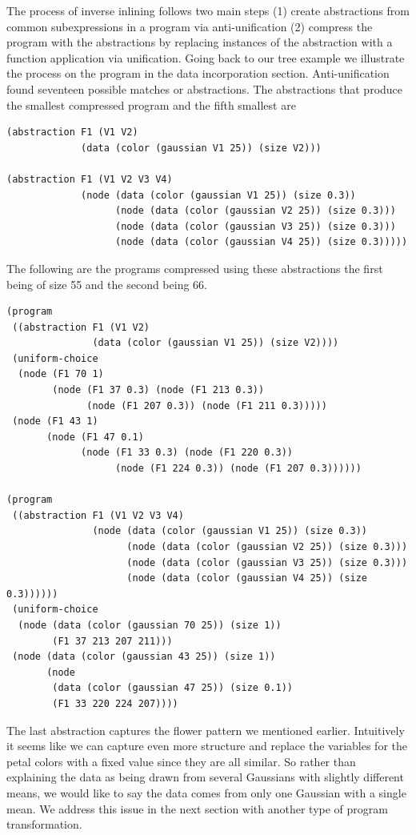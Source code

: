 \documentclass[a4paper,10pt]{article}
\begin{document}
The process of inverse inlining follows two main steps (1) create abstractions from common subexpressions in a program via anti-unification (2) compress the program with the abstractions by replacing instances of the abstraction with a function application via unification.  Going back to our tree example we illustrate the process on the program in the data incorporation section.
Anti-unification found seventeen possible matches or abstractions.  The abstractions that produce the smallest compressed program and the fifth smallest are 
\begin{lstlisting}
(abstraction F1 (V1 V2)
             (data (color (gaussian V1 25)) (size V2)))

(abstraction F1 (V1 V2 V3 V4)
             (node (data (color (gaussian V1 25)) (size 0.3))
                   (node (data (color (gaussian V2 25)) (size 0.3)))
                   (node (data (color (gaussian V3 25)) (size 0.3)))
                   (node (data (color (gaussian V4 25)) (size 0.3)))))
\end{lstlisting}
The following are the programs compressed using these abstractions the first being of size 55 and the second being 66.
\begin{lstlisting}
(program
 ((abstraction F1 (V1 V2)
               (data (color (gaussian V1 25)) (size V2))))
 (uniform-choice
  (node (F1 70 1)
        (node (F1 37 0.3) (node (F1 213 0.3))
              (node (F1 207 0.3)) (node (F1 211 0.3)))))
 (node (F1 43 1)
       (node (F1 47 0.1)
             (node (F1 33 0.3) (node (F1 220 0.3))
                   (node (F1 224 0.3)) (node (F1 207 0.3))))))

(program
 ((abstraction F1 (V1 V2 V3 V4)
               (node (data (color (gaussian V1 25)) (size 0.3))
                     (node (data (color (gaussian V2 25)) (size 0.3)))
                     (node (data (color (gaussian V3 25)) (size 0.3)))
                     (node (data (color (gaussian V4 25)) (size 0.3))))))
 (uniform-choice
  (node (data (color (gaussian 70 25)) (size 1))
        (F1 37 213 207 211)))
 (node (data (color (gaussian 43 25)) (size 1))
       (node
        (data (color (gaussian 47 25)) (size 0.1))
        (F1 33 220 224 207))))
\end{lstlisting}
The last abstraction captures the flower pattern we mentioned earlier.  Intuitively it seems like we can capture even more structure and replace the variables for the petal colors with a fixed value since they are all similar.  So rather than explaining the data as being drawn from several Gaussians with slightly different means, we would like to say the data comes from only one Gaussian with a single mean.  We address this issue in the next section with another type of program transformation.
\end{document}
